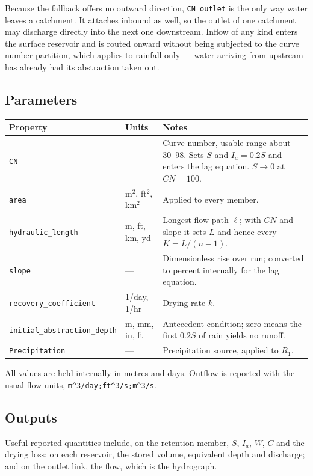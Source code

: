 \documentclass[11pt,a4paper]{article}
\newcommand{\code}[1]{\texttt{\small #1}}
\begin{document}
\noindent
Because the fallback offers no outward direction, \code{CN\_outlet} is the only
way water leaves a catchment. It attaches inbound as well, so the outlet of one
catchment may discharge directly into the next one downstream. Inflow of any
kind enters the surface reservoir and is routed onward without being subjected
to the curve number partition, which applies to rainfall only --- water arriving
from upstream has already had its abstraction taken out.

\subsection{Parameters}

\begin{longtable}{@{}p{}p{}p{}@{}}
\toprule
\textbf{Property} & \textbf{Units} & \textbf{Notes}\\
\midrule
\endhead
\code{CN} & --- & Curve number, usable range about 30--98. Sets $S$ and
$I_a=0.2S$ and enters the lag equation. $S\to0$ at $CN=100$.\\
\code{area} & m$^2$, ft$^2$, km$^2$ & Applied to every member.\\
\code{hydraulic\_length} & m, ft, km, yd & Longest flow path $\ell$; with $CN$
and slope it sets $L$ and hence every $K=L/(n-1)$.\\
\code{slope} & --- & Dimensionless rise over run; converted to percent
internally for the lag equation.\\
\code{recovery\_coefficient} & 1/day, 1/hr & Drying rate $k$.\\
\code{initial\_abstraction\_depth} & m, mm, in, ft & Antecedent condition;
zero means the first $0.2S$ of rain yields no runoff.\\
\code{Precipitation} & --- & Precipitation source, applied to $R_1$.\\
\bottomrule
\end{longtable}

\noindent
All values are held internally in metres and days. Outflow is reported with the
usual flow units, \code{m\textasciicircum3/day;ft\textasciicircum3/s;m\textasciicircum3/s}.

\subsection{Outputs}

Useful reported quantities include, on the retention member, $S$, $I_a$, $W$,
$C$ and the drying loss; on each reservoir, the stored volume, equivalent depth
and discharge; and on the outlet link, the flow, which is the hydrograph.
\end{document}

